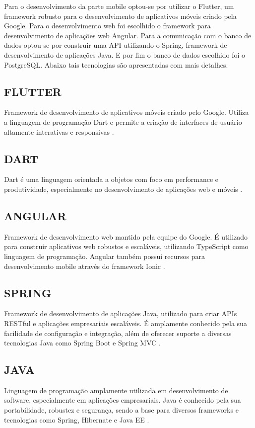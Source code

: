 Para o desenvolvimento da parte mobile optou-se por utilizar o Flutter, um framework robusto para o desenvolvimento de aplicativos móveis criado pela Google. Para o desenvolvimento web foi escolhido o framework para desenvolvimento de aplicações web Angular. Para a comunicação com o banco de dados optou-se por construir uma API utilizando o Spring, framework de desenvolvimento de aplicações Java. E por fim o banco de dados escolhido foi o PostgreSQL. Abaixo tais tecnologias são apresentadas com mais detalhes.

\subsection{FLUTTER}
Framework de desenvolvimento de aplicativos móveis criado pelo Google. Utiliza a linguagem de programação Dart e permite a criação de interfaces de usuário altamente interativas e responsivas \cite{flutter}.


\subsection{DART}
Dart é uma linguagem orientada a objetos com foco em performance e produtividade, especialmente no desenvolvimento de aplicações web e móveis \cite{dart}.

\subsection{ANGULAR}
Framework de desenvolvimento web mantido pela equipe do Google. É utilizado para construir aplicativos web robustos e escaláveis, utilizando TypeScript como linguagem de programação. Angular também possui recursos para desenvolvimento mobile através do framework Ionic \cite{angular}.

\subsection{SPRING}
Framework de desenvolvimento de aplicações Java, utilizado para criar APIs RESTful e aplicações empresariais escaláveis. É amplamente conhecido pela sua facilidade de configuração e integração, além de oferecer suporte a diversas tecnologias Java como Spring Boot e Spring MVC \cite{spring}.

\subsection{JAVA}
Linguagem de programação amplamente utilizada em desenvolvimento de software, especialmente em aplicações empresariais. Java é conhecido pela sua portabilidade, robustez e segurança, sendo a base para diversos frameworks e tecnologias como Spring, Hibernate e Java EE \cite{java}.

